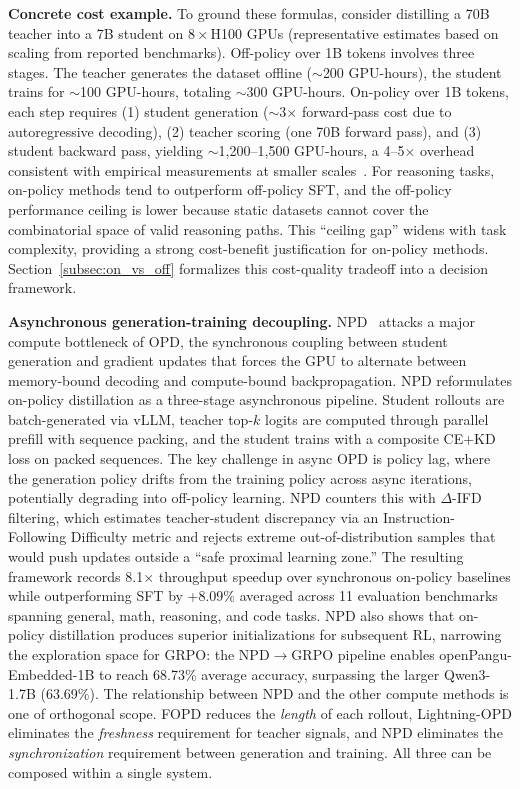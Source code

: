 \documentclass{article} %
\begin{document}
\textbf{Concrete cost example.} To ground these formulas, consider distilling a 70B teacher into a 7B student on $8\times$H100 GPUs (representative estimates based on scaling from reported benchmarks). Off-policy over 1B tokens involves three stages. The teacher generates the dataset offline ($\sim$200 GPU-hours), the student trains for $\sim$100 GPU-hours, totaling $\sim$300 GPU-hours. On-policy over 1B tokens, each step requires (1) student generation ($\sim$3$\times$ forward-pass cost due to autoregressive decoding), (2) teacher scoring (one 70B forward pass), and (3) student backward pass, yielding $\sim$1,200--1,500 GPU-hours, a 4--5$\times$ overhead consistent with empirical measurements at smaller scales~\citep{2604.13010}. For reasoning tasks, on-policy methods tend to outperform off-policy SFT, and the off-policy performance ceiling is lower because static datasets cannot cover the combinatorial space of valid reasoning paths. This ``ceiling gap'' widens with task complexity, providing a strong cost-benefit justification for on-policy methods. Section~\ref{subsec:on_vs_off} formalizes this cost-quality tradeoff into a decision framework.

\textbf{Asynchronous generation-training decoupling.} NPD~\citep{2605.05940} attacks a major compute bottleneck of OPD, the synchronous coupling between student generation and gradient updates that forces the GPU to alternate between memory-bound decoding and compute-bound backpropagation. NPD reformulates on-policy distillation as a three-stage asynchronous pipeline. Student rollouts are batch-generated via vLLM, teacher top-$k$ logits are computed through parallel prefill with sequence packing, and the student trains with a composite CE+KD loss on packed sequences. The key challenge in async OPD is policy lag, where the generation policy drifts from the training policy across async iterations, potentially degrading into off-policy learning. NPD counters this with $\Delta$-IFD filtering, which estimates teacher-student discrepancy via an Instruction-Following Difficulty metric and rejects extreme out-of-distribution samples that would push updates outside a ``safe proximal learning zone.'' The resulting framework records 8.1$\times$ throughput speedup over synchronous on-policy baselines while outperforming SFT by +8.09\% averaged across 11 evaluation benchmarks spanning general, math, reasoning, and code tasks. NPD also shows that on-policy distillation produces superior initializations for subsequent RL, narrowing the exploration space for GRPO: the NPD$\to$GRPO pipeline enables openPangu-Embedded-1B to reach 68.73\% average accuracy, surpassing the larger Qwen3-1.7B (63.69\%). The relationship between NPD and the other compute methods is one of orthogonal scope. FOPD reduces the \emph{length} of each rollout, Lightning-OPD eliminates the \emph{freshness} requirement for teacher signals, and NPD eliminates the \emph{synchronization} requirement between generation and training. All three can be composed within a single system.
\end{document}
